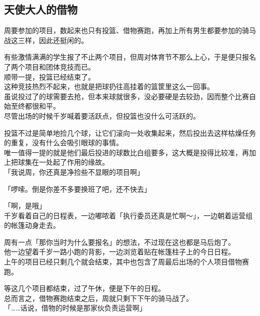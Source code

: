 \subsection{天使大人的借物}

周要参加的项目，数起来也只有投篮、借物赛跑，再加上所有男生都要参加的骑马战这三样，因此还挺闲的。

有些激情满满的学生报了不止两个项目，但周对体育节不那么上心，于是便只报名了两个项目和团体竞技而已。\\

顺带一提，投篮已经结束了。\\

这种竞技热烈不起来，也就是把球扔往高挂着的篮筐里这么一回事。\\

虽说投过了的球需要去抢，但本来球就很多，没必要硬是去较劲，因而整个比赛自始至终都很和平。\\

尽管出场的时候千岁喊着要活跃点，但投篮也没什么可活跃的。

投篮不过是简单地捡几个球，让它们滚向一处收集起来，然后投出去这样枯燥任务的重复，没有什么会吸引眼球的事情。\\

唯一值得一提的就是他们最后投进的球数比白组要多，这大概是投得比较准，再加上把球集在一处起了作用的缘故。\\

「我说周，你还真是净捡些不显眼的项目啊」

「啰嗦。倒是你差不多要换班了吧，还不快去」

「啊，是哦」\\

千岁看着自己的日程表，一边嘟哝着「执行委员还真是忙啊～」，一边朝着运营组的帐篷动身走去。

周有一点「那你当时为什么要报名」的想法，不过现在这也都是马后炮了。\\

他一边望着千岁一路小跑的背影，一边浏览着贴在帐篷柱子上的今日日程。\\

上午的项目已经只剩几个就会结束，其中也包含了周最后出场的个人项目借物赛跑。

等这几个项目都结束，过了午休，便是下午的日程。\\

总而言之，借物赛跑结束之后，周就只剩下下午的骑马战了。\\

「……话说，借物的时候是那家伙负责运营啊」\\

